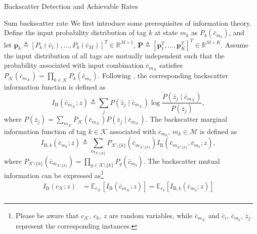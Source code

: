 \documentclass[journal]{IEEEtran}
\begin{document}
\begin{section}{Backscatter Detection and Achievable Rates}
		\begin{subsection}{Sum backscatter rate}
			We first introduce some prerequisites of information theory. Define the input probability distribution of tag $k$ at state $m_k$ as $P_k(\bar{c}_{m_k})$, and let $\boldsymbol{p}_k \triangleq [P_k(\bar{c}_1),\ldots,P_k(\bar{c}_M)]^T \in \mathbb{R}^{M \times 1}$, $\boldsymbol{P} \triangleq [\boldsymbol{p}_1^T,\ldots,\boldsymbol{p}_K^T]^T \in \mathbb{R}^{M \times K}$. Assume the input distribution of all tags are mutually independent such that the probability associated with input combination $\bar{c}_{m_{\mathcal{K}}}$ satisfies $P_{\mathcal{K}}(\bar{c}_{m_{\mathcal{K}}}) = \prod_{k \in \mathcal{K}} P_k(\bar{c}_{m_k})$. Following \cite{Rezaeian2004}, the corresponding backscatter information function is defined as
			\begin{equation}
				I_{\mathrm{B}}(\bar{c}_{m_{\mathcal{K}}};z) \triangleq \sum_j P(\bar{z}_j \mid \bar{c}_{m_{\mathcal{K}}}) \log \frac{P(\bar{z}_j \mid \bar{c}_{m_{\mathcal{K}}})}{P(\bar{z}_j)},
				\label{eq:backscatter_information_function}
			\end{equation}
			where $P(\bar{z}_j) = \sum_{m_{\mathcal{K}}} P_{\mathcal{K}}(\bar{c}_{m_{\mathcal{K}}}) P(\bar{z}_j \mid \bar{c}_{m_{\mathcal{K}}})$.
			The backscatter marginal information function of tag $k \in \mathcal{K}$ associated with $\bar{c}_{m_k}$, $m_k \in \mathcal{M}$ is defined as
			\begin{equation}
				I_{\mathrm{B},k}(\bar{c}_{m_k};z) \triangleq \sum_{m_{\mathcal{K} \setminus \{k\}}} P_{\mathcal{K} \setminus \{k\}}(\bar{c}_{m_{\mathcal{K} \setminus \{k\}}}) I_{\mathrm{B}}(\bar{c}_{m_{\mathcal{K} \setminus \{k\}}},\bar{c}_{m_k};z),
				\label{eq:backscatter_marginal_information_function}
			\end{equation}
			where $P_{\mathcal{K} \setminus \{k\}}(\bar{c}_{m_{\mathcal{K} \setminus \{k\}}}) = \prod_{q \in \mathcal{K} \setminus \{k\}} P_{q}(\bar{c}_{m_{q}})$. The backscatter mutual information can be expressed as\footnote{Please be aware that $c_{\mathcal{K}}$, $c_k$, $z$ are random variables, while $\bar{c}_{m_{\mathcal{K}}}$ and $\bar{c}_i$, $\bar{c}_{m_k}$, $\bar{z}_j$ represent the corresponding instances.}
			\begin{subequations}
				\begin{align}
					I_{\mathrm{B}}(c_{\mathcal{K}};z)
					& = \mathbb{E}_{c_{\mathcal{K}}} \left[I_{\mathrm{B}}(\bar{c}_{m_{\mathcal{K}}};z)\right] = \mathbb{E}_{c_k} \left[I_{\mathrm{B},k}(\bar{c}_{m_k};z)\right]\label{eq:backscatter_sum_rate_expectation}\\

\end{align}
\end{subequations}
\end{subsection}
\end{section}
\end{document}
